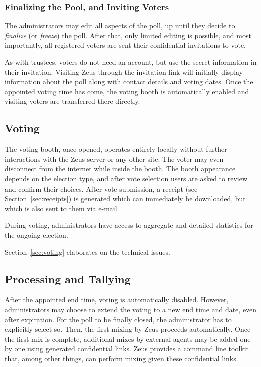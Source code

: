 \documentclass[letterpaper,10pt]{article}
\begin{document}
\subsubsection{Finalizing the Pool, and Inviting Voters}
The administrators may edit all aspects of the poll, up until they
decide to \emph{finalize} (or \emph{freeze}) the poll.
After that, only limited editing is possible, and most importantly,
all registered voters are sent their confidential invitations to vote.

As with trustees, voters do not need an account, but use the secret
information in their invitation.
Visiting Zeus through the invitation link will initially display
information about the poll along with contact details and voting dates.
Once the appointed voting time has come, the voting booth is
automatically enabled and visiting voters are transferred there directly.

\subsection{Voting}
The voting booth, once opened, operates entirely locally without
further interactions with the Zeus server or any other site.
The voter may even disconnect from the internet while inside the booth.
The booth appearance depends on the election type, and after vote
selection users are asked to review and confirm their choices.
After vote submission, a receipt (see Section~\ref{sec:receipts}) is
generated which can immediately be downloaded, but which is also sent
to them via e-mail.

During voting, administrators have access to aggregate and detailed
statistics for the ongoing election.

Section~\ref{sec:voting} elaborates on the technical issues.

\subsection{Processing and Tallying}
After the appointed end time, voting is automatically disabled.
However, administrators may choose to extend the voting to a new end
time and date, even after expiration.
For the poll to be finally closed,
the administrator has to explicitly select so.
Then, the first mixing by Zeus proceeds automatically.
Once the first mix is complete, additional mixes by external agents
may be added one by one using generated confidential links.
Zeus provides a command line toolkit that, among other things, can
perform mixing given these confidential links.
\end{document}
